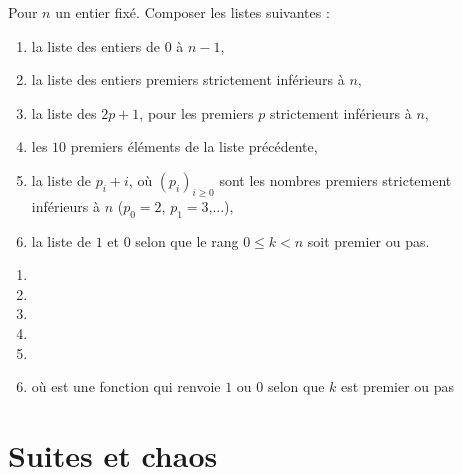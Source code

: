 \begin{frame}
\begin{tp}\vspace*{-0.5ex}
Pour $n$ un entier fixé. Composer les listes suivantes :\vspace*{-0.5ex}
\begin{enumerate}
  \item la liste des entiers de $0$ à $n-1$,
  
  \item la liste des entiers premiers strictement inférieurs à $n$,
  
  \item la liste des $2p+1$, pour les premiers $p$ strictement inférieurs à $n$,
  
  \item les $10$ premiers éléments de la liste précédente,
  
  \item la liste de $p_i+i$, où $(p_i)_{i\ge0}$ sont les nombres premiers 
  strictement inférieurs à $n$ ($p_0=2$, $p_1=3$,...),
  
  \item la liste de $1$ et $0$ selon que le rang $0\le k <n$ soit premier ou pas.
\end{enumerate}
\end{tp}
\pause\vspace*{-1ex}
\begin{enumerate}
  \item {} \pause
  \item {} \pause
  \item {} \pause
  \item {} \pause
  \item {} \pause
  \item {} 
  où  est une fonction qui renvoie $1$ ou $0$ selon que $k$ est premier ou pas 
\end{enumerate}


\end{frame}




\section{Suites et chaos}

